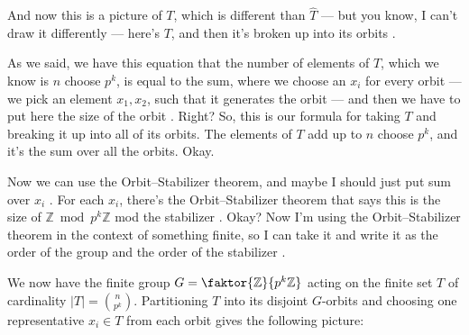 \begin{proofWrapper}
\begin{speech}[00:39:05 - 00:40:58]
And now this is a picture of $T$, which is different than $\widehat{T}$ --- but you know, I can't draw it differently --- here's $T$, and then it's broken up into its orbits .

As we said, we have this equation that the number of elements of $T$, which we know is $n$ choose $p^k$, is equal to the sum, where we choose an $x_i$ for every orbit --- we pick an element $x_1, x_2$, such that it generates the orbit  --- and then we have to put here the size of the orbit . Right? So, this is our formula for taking $T$ and breaking it up into all of its orbits. The elements of $T$ add up to $n$ choose $p^k$, and it's the sum over all the orbits. Okay.

Now we can use the Orbit--Stabilizer theorem, and maybe I should just put sum over $x_i$ . For each $x_i$, there's the Orbit--Stabilizer theorem that says this is the size of $\mathbb{Z} \bmod p^k \mathbb{Z}$ mod the stabilizer . Okay? Now I'm using the Orbit--Stabilizer theorem in the context of something finite, so I can take it and write it as the order of the group and the order of the stabilizer .
\end{speech}

\begin{content}
We now have the finite group $G = \faktor{\mathbb{Z}}{p^k\mathbb{Z}}$ acting on the finite set $T$ of cardinality $|T| = \binom{n}{p^k}$. Partitioning $T$ into its disjoint $G$-orbits and choosing one representative $x_i \in T$ from each orbit gives the following picture:


\end{content}
\end{proofWrapper}

